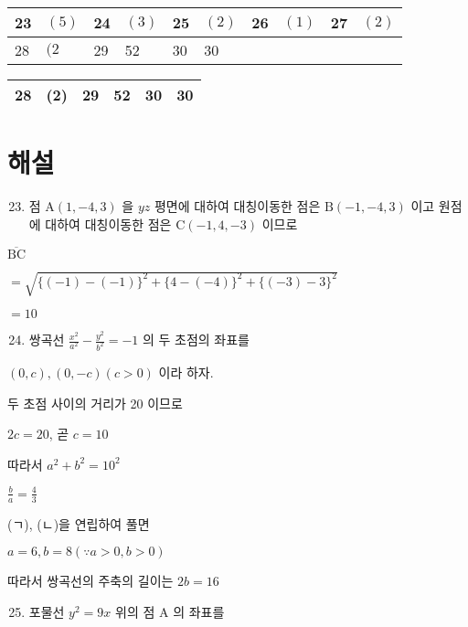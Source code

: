 \documentclass[10pt]{article}
\begin{document}
\begin{center}
\begin{tabular}{|l|l|l|l|l|l|l|l|l|l|}
\hline
23 & $(5)$ & 24 & $(3)$ & 25 & $(2)$ & 26 & $(1)$ & 27 & $(2)$ \\
\hline
28 & $(2$ & 29 & 52 & 30 & 30 &  &  &  &  \\
\hline
\end{tabular}
\end{center}

\begin{center}
\begin{tabular}{l|l|l|l|l|l|}
\hline
28 & (2) & 29 & 52 & 30 & 30 \\
\hline
\end{tabular}
\end{center}

\section*{해설}
\begin{enumerate}
  \setcounter{enumi}{22}
  \item 점 $\mathrm{A}(1,-4,3)$ 을 $y z$ 평면에 대하여 대칭이동한 점은 $\mathrm{B}(-1,-4,3)$ 이고 원점에 대하여 대칭이동한 점은 $\mathrm{C}(-1,4,-3)$ 이므로
\end{enumerate}

$\overline{\mathrm{BC}}$

$=\sqrt{\{(-1)-(-1)\}^{2}+\{4-(-4)\}^{2}+\{(-3)-3\}^{2}}$

$=10$

\begin{enumerate}
  \setcounter{enumi}{23}
  \item 쌍곡선 $\frac{x^{2}}{a^{2}}-\frac{y^{2}}{b^{2}}=-1$ 의 두 초점의 좌표를
\end{enumerate}

$(0, c),(0,-c)(c>0)$ 이라 하자.

두 초점 사이의 거리가 20 이므로

$2 c=20$, 곧 $c=10$

따라서 $a^{2}+b^{2}=10^{2}$

$\frac{b}{a}=\frac{4}{3}$

(ㄱ), (ㄴ)을 연립하여 풀면

$a=6, b=8(\because a>0, b>0)$

따라서 쌍곡선의 주축의 길이는 $2 b=16$

\begin{enumerate}
  \setcounter{enumi}{24}
  \item 포물선 $y^{2}=9 x$ 위의 점 A 의 좌표를
\end{enumerate}
\end{document}
